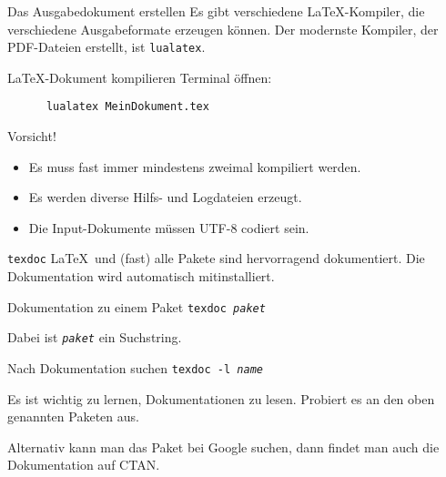 \begin{frame}[fragile]{Das Ausgabedokument erstellen}
  Es gibt verschiedene \LaTeX-Kompiler, die verschiedene Ausgabeformate erzeugen können.
  Der modernste Kompiler, der PDF-Dateien erstellt, ist \alert{\texttt{lualatex}}.

  \begin{block}{\LaTeX-Dokument kompilieren}
    Terminal öffnen:
    \begin{lstlisting}
      lualatex MeinDokument.tex
    \end{lstlisting}
  \end{block}

  \begin{alertblock}{Vorsicht!}
    \begin{itemize}
      \item Es muss fast immer mindestens zweimal kompiliert werden.
      \item Es werden diverse Hilfs- und Logdateien erzeugt.
      \item Die Input-Dokumente müssen UTF-8 codiert sein.
    \end{itemize}
  \end{alertblock}
\end{frame}

\begin{frame}{\texttt{texdoc}}
  \LaTeX\ und (fast) alle Pakete sind hervorragend dokumentiert. Die Dokumentation wird automatisch mitinstalliert.
  \begin{block}{Dokumentation zu einem Paket}
    \texttt{texdoc \textit{paket}}
  \end{block}

  Dabei ist \texttt{\textit{paket}} ein Suchstring.
  \begin{block}{Nach Dokumentation suchen}
    \texttt{texdoc -l \textit{name}}
  \end{block}

  Es ist wichtig zu lernen, Dokumentationen zu lesen. Probiert es an den oben genannten Paketen aus.

  \vspace{10pt}
  Alternativ kann man das Paket bei Google suchen, dann findet man auch die Dokumentation auf CTAN.
\end{frame}
